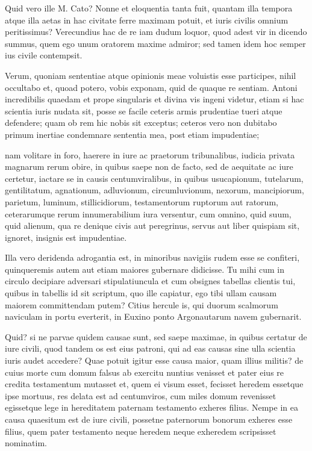  Quid vero ille M. Cato? Nonne et eloquentia tanta fuit, quantam illa tempora atque illa aetas in hac civitate ferre maximam potuit, et iuris civilis omnium peritissimus? Verecundius hac de re iam dudum loquor, quod adest vir in dicendo summus, quem ego unum oratorem maxime admiror; sed tamen idem hoc semper ius civile contempsit.

 Verum, quoniam sententiae atque opinionis meae voluistis esse participes, nihil occultabo et, quoad potero, vobis exponam, quid de quaque re sentiam. Antoni incredibilis quaedam et prope singularis et divina vis ingeni videtur, etiam si hac scientia iuris nudata sit, posse se facile ceteris armis prudentiae tueri atque defendere; quam ob rem hic nobis sit exceptus; ceteros vero non dubitabo primum inertiae condemnare sententia mea, post etiam impudentiae;

 nam volitare in foro, haerere in iure ac praetorum tribunalibus, iudicia privata magnarum rerum obire, in quibus saepe non de facto, sed de aequitate ac iure certetur, iactare se in causis centumviralibus, in quibus usucapionum, tutelarum, gentilitatum, agnationum, adluvionum, circumluvionum, nexorum, mancipiorum, parietum, luminum, stillicidiorum, testamentorum ruptorum aut ratorum, ceterarumque rerum innumerabilium iura versentur, cum omnino, quid suum, quid alienum, qua re denique civis aut peregrinus, servus aut liber quispiam sit, ignoret, insignis est impudentiae.

 Illa vero deridenda adrogantia est, in minoribus navigiis rudem esse se confiteri, quinqueremis autem aut etiam maiores gubernare didicisse. Tu mihi cum in circulo decipiare adversari stipulatiuncula et cum obsignes tabellas clientis tui, quibus in tabellis id sit scriptum, quo ille capiatur, ego tibi ullam causam maiorem committendam putem? Citius hercule is, qui duorum scalmorum naviculam in portu everterit, in Euxino ponto Argonautarum navem gubernarit.

 Quid? si ne parvae quidem causae sunt, sed saepe maximae, in quibus certatur de iure civili, quod tandem os est eius patroni, qui ad eas causas sine ulla scientia iuris audet accedere? Quae potuit igitur esse causa maior, quam illius militis? de cuius morte cum domum falsus ab exercitu nuntius venisset et pater eius re credita testamentum mutasset et, quem ei visum esset, fecisset heredem essetque ipse mortuus, res delata est ad centumviros, cum miles domum revenisset egissetque lege in hereditatem paternam testamento exheres filius. Nempe in ea causa quaesitum est de iure civili, possetne paternorum bonorum exheres esse filius, quem pater testamento neque heredem neque exheredem scripsisset nominatim.

